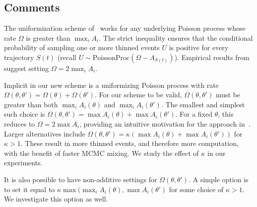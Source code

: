 \subsection{Comments}

The uniformization scheme of~\cite{RaoTeh13} works for any underlying Poisson
process whose rate $\Omega$ is greater than $\max_i A_i$. The strict inequality
ensures that the conditional probability of sampling one or more thinned events 
$U$ is positive for every trajectory $S(t)$ (recall 
$U \sim \text{PoissonProc}(\Omega-A_{S(t)})$). Empirical results from~\cite{RaoTeh13}
suggest setting $\Omega = 2 \max_i A_i$.

Implicit in our new scheme is a uniformizing Poisson process with rate
$\Omega(\theta,\theta') = \Omega(\theta) + \Omega(\theta')$. For our 
scheme to be valid, $\Omega(\theta,\theta')$ must be greater than both
$\max_i A_i(\theta)$ and $\max_i A_i(\theta')$. The smallest and simplest such
choice is $\Omega(\theta,\theta') = \max A_i(\theta) + \max A_i(\theta')$.
For a fixed $\theta$, this reduces to $\Omega = 2\max A_i$, providing
an intuitive motivation for the approach in~\cite{RaoTeh13}.
Larger alternatives include 
$\Omega(\theta,\theta') = \kappa(\max A_i(\theta) + \max A_i(\theta'))$
for $\kappa > 1$.  These result in more thinned events, and therefore more 
computation, with the benefit of faster MCMC mixing. We study the effect of 
$\kappa$ in our experiments.

It is also possible to have non-additive settings for $\Omega(\theta,\theta')$.
A simple option is to set it equal to 
$\kappa \max( \max_i A_i(\theta), \max A_i(\theta')$ for some choice of $\kappa
> 1$. We investigate this option as well.
